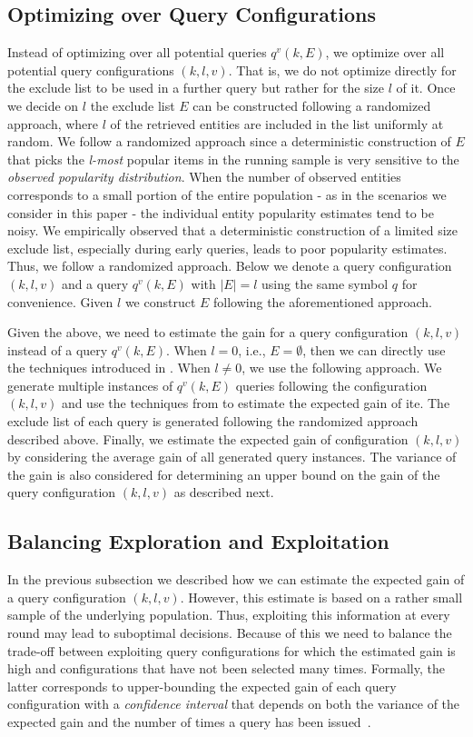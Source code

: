 \subsection{Optimizing over Query Configurations}
\label{sec:config}
Instead of optimizing over all potential queries $q^v(k,E)$, we optimize over all potential query configurations $(k,l,v)$. That is, we do not optimize directly for the exclude list to be used in a further query but rather for the size $l$ of it. Once we decide on $l$ the exclude list $E$ can be constructed following a randomized approach, where $l$ of the retrieved entities are included in the list uniformly at random. We follow a randomized approach since a deterministic construction of $E$ that picks the {\em l-most} popular items in the running sample is very sensitive to the {\em observed popularity distribution}. When the number of observed entities corresponds to a small portion of the entire population - as in the scenarios we consider in this paper - the individual entity popularity estimates tend to be noisy.  We empirically observed that a deterministic construction of a limited size exclude list, especially during early queries, leads to poor popularity estimates. Thus, we follow a randomized approach. Below we denote a query configuration $(k,l,v)$ and a query $q^v(k,E)$ with $|E| = l$ using the same symbol $q$ for convenience. Given $l$ we construct $E$ following the aforementioned approach.

Given the above, we need to estimate the gain for a query configuration $(k,l,v)$ instead of a query $q^v(k,E)$. When $l = 0$, i.e., $E = \emptyset$, then we can directly use the techniques introduced in . When $l \neq 0$, we use the following approach. We generate multiple instances of $q^v(k,E)$ queries following the configuration $(k,l,v)$ and use the techniques from  to estimate the expected gain of ite. The exclude list of each query is generated following the randomized approach described above. Finally, we estimate the expected gain of configuration $(k,l,v)$ by considering the average gain of all generated query instances. The variance of the gain is also considered for determining an upper bound on the gain of the query configuration $(k,l,v)$ as described next.

\subsection{Balancing Exploration and Exploitation}
\label{sec:balancing}
In the previous subsection we described how we can estimate the expected gain of a query configuration $(k,l,v)$. However, this estimate is based on a rather small sample of the underlying population. Thus, exploiting this information at every round may lead to suboptimal decisions. Because of this we need to balance the trade-off between exploiting query configurations for which the estimated gain is high and configurations that have not been selected many times. Formally, the latter corresponds to upper-bounding the expected gain of each query configuration with a {\em confidence interval} that depends on both the variance of the expected gain and the number of times a query has been issued~\cite{Auer:2003}.

